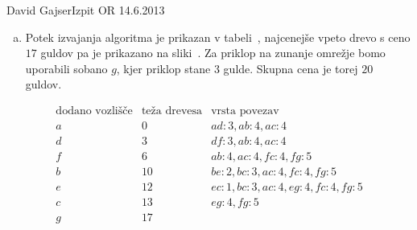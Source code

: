 \begin{naloga}{David Gajser}{Izpit OR 14.6.2013}
\begin{odgovor}
\begin{enumerate}[(a)]
\item Potek izvajanja algoritma je prikazan v tabeli~\tab,
najcenejše vpeto drevo s ceno $17$ guldov
pa je prikazano na sliki~.
Za priklop na zunanje omrežje bomo uporabili sobano $g$,
kjer priklop stane $3$ gulde.
Skupna cena je torej $20$ guldov.
\end{enumerate}
%
\begin{tabela}
$$
\begin{array}{c|c|l}
\text{dodano vozlišče} & \text{teža drevesa} & \text{vrsta povezav} \\ \hline
a &  0 & ad: 3, ab: 4, ac: 4 \\
d &  3 & df: 3, ab: 4, ac: 4 \\
f &  6 & ab: 4, ac: 4, fc: 4, fg: 5 \\
b & 10 & be: 2, bc: 3, ac: 4, fc: 4, fg: 5 \\
e & 12 & ec: 1, bc: 3, ac: 4, eg: 4, fc: 4, fg: 5 \\
c & 13 & eg: 4, fg: 5 \\
g & 17 &
\end{array}
$$
\end{tabela}
%
\begin{slika}
\end{slika}
\end{odgovor}
\end{naloga}
